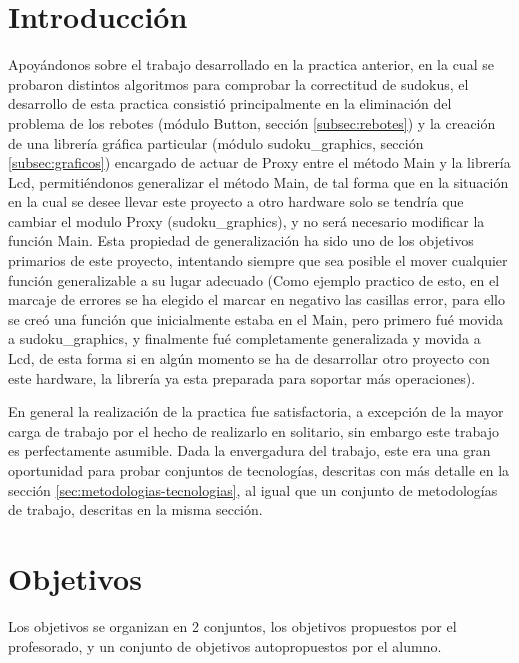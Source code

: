 \documentclass[12pt,letterpaper]{article}
\begin{document}
\section{Introducción}
\label{sec:introduccion}
Apoyándonos sobre el trabajo desarrollado en la practica anterior, en
la cual se probaron distintos algoritmos para comprobar la correctitud
de sudokus, el desarrollo de esta practica consistió principalmente en
la eliminación del problema de los rebotes (módulo Button, sección
\ref{subsec:rebotes}) y la creación de una librería gráfica particular
(módulo sudoku\_graphics, sección \ref{subsec:graficos}) encargado de
actuar de Proxy entre el método Main y la librería Lcd, permitiéndonos
generalizar el método Main, de tal forma que en la situación en la
cual se desee llevar este proyecto a otro hardware solo se tendría que
cambiar el modulo Proxy (sudoku\_graphics), y no será necesario
modificar la función Main.  Esta propiedad de generalización ha sido
uno de los objetivos primarios de este proyecto, intentando siempre
que sea posible el mover cualquier función generalizable a su lugar
adecuado (Como ejemplo practico de esto, en el marcaje de errores se
ha elegido el marcar en negativo las casillas error, para ello se creó
una función que inicialmente estaba en el Main, pero primero fué
movida a sudoku\_graphics, y finalmente fué completamente generalizada
y movida a Lcd, de esta forma si en algún momento se ha de desarrollar
otro proyecto con este hardware, la librería ya esta preparada para
soportar más operaciones).

En general la realización de la practica fue satisfactoria, a
excepción de la mayor carga de trabajo por el hecho de realizarlo en
solitario, sin embargo este trabajo es perfectamente asumible.  Dada
la envergadura del trabajo, este era una gran oportunidad para probar
conjuntos de tecnologías, descritas con más detalle en la sección
\ref{sec:metodologias-tecnologias}, al igual que un conjunto de
metodologías de trabajo, descritas en la misma sección.

\section{Objetivos}
\label{sec:objetivos}
Los objetivos se organizan en 2 conjuntos, los objetivos propuestos
por el profesorado, y un conjunto de objetivos autopropuestos por el
alumno.
\end{document}
